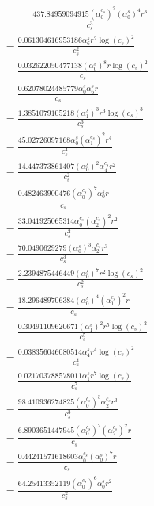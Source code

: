 \documentclass[10pt]{article}
\begin{document}
\begin{align*}
\phantom{R_{3,9}} &\phantom{={}}{}  - \frac{437.84959094915 \left(\alpha_{0}^{c_s}\right)^{2} \left(\alpha_{0}^s\right)^{4} r^{3}}{c_{s}^{3}} \\
&{}  - \frac{0.061304616953186 \alpha_{6}^s r^{2} \log{\left(c_{s} \right)}^{2}}{c_{s}^{2}} \\
&{}  - \frac{0.032622050477138 \left(\alpha_{0}^s\right)^{8} r \log{\left(c_{s} \right)}^{2}}{c_{s}} \\
&{}  - \frac{0.62078024485779 \alpha_{0}^s \alpha_{6}^s r}{c_{s}} \\
&{}  - \frac{1.3851079105218 \left(\alpha_{1}^s\right)^{3} r^{3} \log{\left(c_{s} \right)}^{3}}{c_{s}^{3}} \\
&{}  - \frac{45.02726097168 \alpha_{0}^s \left(\alpha_{1}^{c_s}\right)^{2} r^{4}}{c_{s}^{4}} \\
&{}  - \frac{14.447373861407 \left(\alpha_{0}^s\right)^{2} \alpha_{4}^{c_s} r^{2}}{c_{s}^{2}} \\
&{}  - \frac{0.482463900476 \left(\alpha_{0}^{c_s}\right)^{7} \alpha_{0}^s r}{c_{s}} \\
&{}  - \frac{33.041925065314 \alpha_{0}^{c_s} \left(\alpha_{2}^{c_s}\right)^{2} r^{2}}{c_{s}^{2}} \\
&{}  - \frac{70.0490629279 \left(\alpha_{0}^s\right)^{3} \alpha_{2}^{c_s} r^{3}}{c_{s}^{3}} \\
&{}  - \frac{2.2394875446449 \left(\alpha_{0}^s\right)^{7} r^{2} \log{\left(c_{s} \right)}^{2}}{c_{s}^{2}} \\
&{}  - \frac{18.296489706384 \left(\alpha_{0}^s\right)^{4} \left(\alpha_{1}^{c_s}\right)^{2} r}{c_{s}} \\
&{}  - \frac{0.30491109620671 \left(\alpha_{1}^s\right)^{2} r^{5} \log{\left(c_{s} \right)}^{2}}{c_{s}^{5}} \\
&{}  - \frac{0.038356046080514 \alpha_{4}^s r^{4} \log{\left(c_{s} \right)}^{2}}{c_{s}^{4}} \\
&{}  - \frac{0.021703788578011 \alpha_{1}^s r^{7} \log{\left(c_{s} \right)}}{c_{s}^{7}} \\
&{}  - \frac{98.410936274825 \left(\alpha_{0}^{c_s}\right)^{3} \alpha_{2}^{c_s} r^{3}}{c_{s}^{3}} \\
&{}  - \frac{6.8903651447945 \left(\alpha_{0}^{c_s}\right)^{2} \left(\alpha_{2}^{c_s}\right)^{2} r}{c_{s}} \\
&{}  - \frac{0.44241571618603 \alpha_{0}^{c_s} \left(\alpha_{0}^s\right)^{7} r}{c_{s}} \\
&{}  - \frac{64.25413352119 \left(\alpha_{0}^{c_s}\right)^{6} \alpha_{0}^s r^{2}}{c_{s}^{2}} \\

\end{align*}
\end{document}
